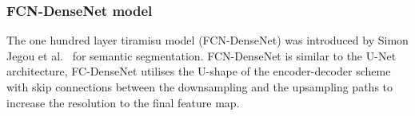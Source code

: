 \subsubsection{FCN-DenseNet model}
The one hundred layer tiramisu model (FCN-DenseNet) was introduced by Simon Jegou et al.~\cite{Jegou} for semantic segmentation.
FCN-DenseNet is similar to the U-Net architecture, FC-DenseNet utilises the U-shape of the encoder-decoder scheme with skip connections between the downsampling and the upsampling paths to increase the resolution to the final feature map.

